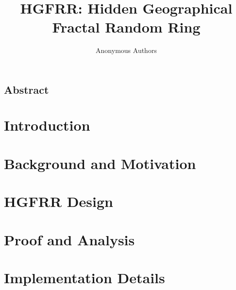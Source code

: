 \documentclass[letterpaper,twocolumn,10pt]{article}
\begin{document}
\date{}

\title{\Large \bf HGFRR: Hidden Geographical Fractal Random Ring}


\author{
{\rm Anonymous Authors}\\
}

\maketitle

\thispagestyle{empty}

\subsection*{Abstract}


\section{Introduction}


\section{Background and Motivation}


\section{HGFRR Design}


\section{Proof and Analysis}


\section{Implementation Details}

\end{document}
